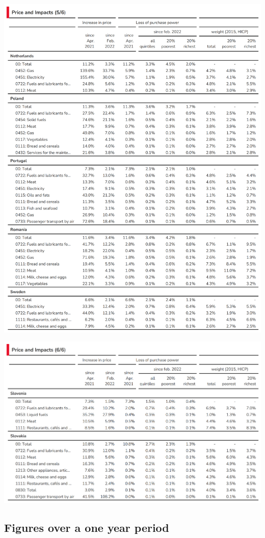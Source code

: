 \documentclass[
  9pt,
  a4paper,
  DIV=11,
  numbers=noendperiod]{scrartcl}
\begin{document}
\includegraphics[width=17cm,height=\textheight]{../svg/annex_5.png}

\includegraphics[width=17cm,height=\textheight]{../svg/annex_6.png}

\newpage

\hypertarget{figures-over-a-one-year-period}{%
\subsection{Figures over a one year
period}\label{figures-over-a-one-year-period}}
\end{document}

